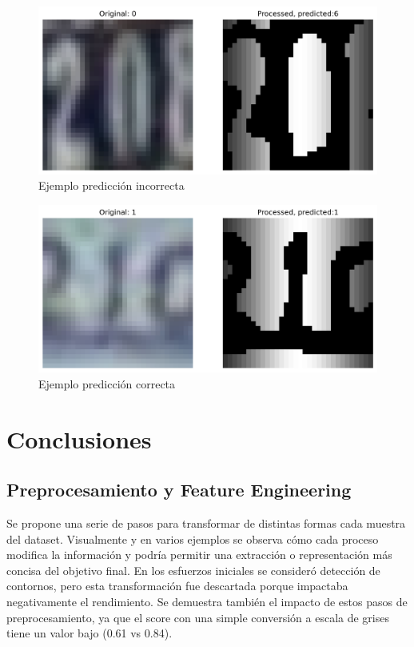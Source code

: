\documentclass[journal]{IEEEtran}
\begin{document}
\begin{figure}[H]
        \centering
        \includegraphics[width=\linewidth]{figures/pred_example_actual_0_pred_6.png}
        \caption{Ejemplo predicción incorrecta}
        \label{fig:Ejemplo3}
\end{figure}

\begin{figure}[H]
        \centering
        \includegraphics[width=\linewidth]{figures/pred_example_actual_1_pred_1.png}
        \caption{Ejemplo predicción correcta}
        \label{fig:Ejemplo4}
\end{figure}

\section{Conclusiones}

\subsection{Preprocesamiento y Feature Engineering}
Se propone una serie de pasos para transformar de distintas formas cada muestra del dataset. Visualmente y en varios ejemplos se observa cómo cada proceso modifica la información y podría permitir una extracción o representación más concisa del objetivo final. En los esfuerzos iniciales se consideró detección de contornos, pero esta transformación fue descartada porque impactaba negativamente el rendimiento. Se demuestra también el impacto de estos pasos de preprocesamiento, ya que el score con una simple conversión a escala de grises tiene un valor bajo (0.61 vs 0.84).
\end{document}
